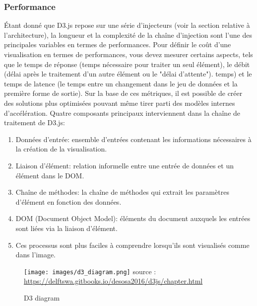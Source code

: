 \documentclass[french, a4paper, 12pt]{report}
\begin{document}
\subsubsection{Performance}
Étant donné que D3.js repose sur une série d’injecteurs (voir la section relative à l’architecture), la longueur et la complexité de la chaîne d’injection sont l’une des principales variables en termes de performances. Pour définir le coût d'une visualisation en termes de performances, vous devez mesurer certains aspects, tels que le temps de réponse (temps nécessaire pour traiter un seul élément), le débit (délai après le traitement d'un autre élément ou le "délai d'attente"). temps) et le temps de latence (le temps entre un changement dans le jeu de données et la première forme de sortie). Sur la base de ces métriques, il est possible de créer des solutions plus optimisées pouvant même tirer parti des modèles internes d’accélération.
Quatre composants principaux interviennent dans la chaîne de traitement de D3.js:
\begin{enumerate}
    \item Données d'entrée: ensemble d'entrées contenant les informations nécessaires à la création de la visualisation.
    \item Liaison d'élément: relation informelle entre une entrée de données et un élément dans le DOM.
    \item Chaîne de méthodes: la chaîne de méthodes qui extrait les paramètres d'élément en fonction des données.
    \item DOM (Document Object Model): éléments du document auxquels les entrées sont liées via la liaison d'élément.
    \item Ces processus sont plus faciles à comprendre lorsqu’ils sont visualisés comme dans l’image.
    
\end{enumerate}
\begin{figure}[!htp]
    \centering
    \texttt{[image: images/d3\_diagram.png]}
    \scriptsize{source : \url{https://delftswa.gitbooks.io/desosa2016/d3js/chapter.html}}
    \caption{D3 diagram}
    \label{fig:2.16}
\end{figure}
\end{document}
